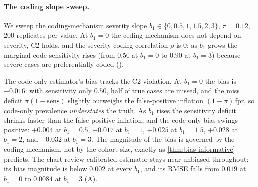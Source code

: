 \paragraph{The coding slope sweep.} We sweep the coding-mechanism
severity slope $b_1 \in \{0, 0.5, 1, 1.5, 2, 3\}$, $\pi = 0.12$, $200$
replicates per value. At $b_1 = 0$ the coding mechanism does not depend
on severity, C2 holds, and the severity-coding correlation $\rho$ is
$0$; as $b_1$ grows the marginal code sensitivity rises (from $0.50$ at
$b_1 = 0$ to $0.90$ at $b_1 = 3$) because severe cases are
preferentially coded ().

The code-only estimator's bias tracks the C2 violation. At $b_1 = 0$
the bias is $-0.016$: with sensitivity only $0.50$, half of true cases
are missed, and the miss deficit $\pi(1 - \mathrm{sens})$ slightly
outweighs the false-positive inflation $(1-\pi)\,\mathrm{fpr}$, so
code-only prevalence \emph{understates} the truth. As $b_1$ rises the
sensitivity deficit shrinks faster than the false-positive inflation,
and the code-only bias swings positive: $+0.004$ at $b_1 = 0.5$,
$+0.017$ at $b_1 = 1$, $+0.025$ at $b_1 = 1.5$, $+0.028$ at $b_1 = 2$,
and $+0.032$ at $b_1 = 3$. The magnitude of the bias is governed by the
coding mechanism, not by the cohort size, exactly as
\cref{thm:bias-informative} predicts. The chart-review-calibrated
estimator stays near-unbiased throughout: its bias magnitude is below
$0.002$ at every $b_1$, and its RMSE falls from $0.019$ at $b_1 = 0$ to
$0.0084$ at $b_1 = 3$ (A).

